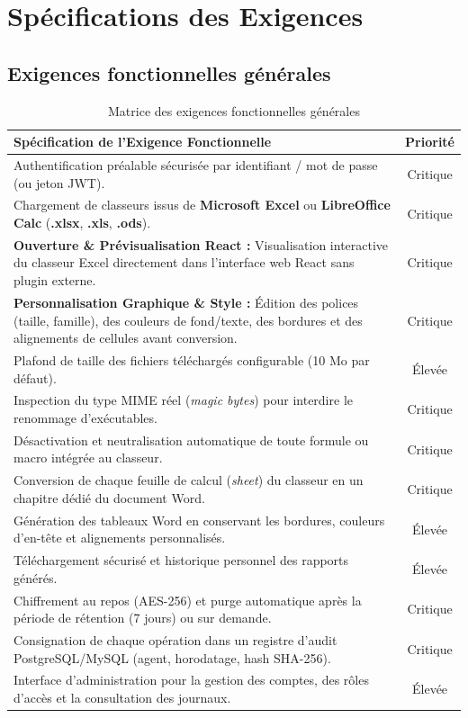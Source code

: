 \chapter{Spécifications des Exigences}

\section{Exigences fonctionnelles générales}

\renewcommand{\arraystretch}{1.3}
\begin{table}[H]
\centering
\small
\begin{tabular}{|L{11.5cm}|c|}
\hline
{}
\textbf{Spécification de l'Exigence Fonctionnelle} & \textbf{Priorité} \\
\hline
Authentification préalable sécurisée par identifiant / mot de passe (ou jeton JWT). & Critique \\
\hline
Chargement de classeurs issus de \textbf{Microsoft Excel} ou \textbf{LibreOffice Calc} (\textbf{.xlsx}, \textbf{.xls}, \textbf{.ods}). & Critique \\
\hline
\textbf{Ouverture \& Prévisualisation React :} Visualisation interactive du classeur Excel directement dans l'interface web React sans plugin externe. & Critique \\
\hline
\textbf{Personnalisation Graphique \& Style :} Édition des polices (taille, famille), des couleurs de fond/texte, des bordures et des alignements de cellules avant conversion. & Critique \\
\hline
Plafond de taille des fichiers téléchargés configurable (10 Mo par défaut). & Élevée \\
\hline
Inspection du type MIME réel (\textit{magic bytes}) pour interdire le renommage d'exécutables. & Critique \\
\hline
Désactivation et neutralisation automatique de toute formule ou macro intégrée au classeur. & Critique \\
\hline
Conversion de chaque feuille de calcul (\textit{sheet}) du classeur en un chapitre dédié du document Word. & Critique \\
\hline
Génération des tableaux Word en conservant les bordures, couleurs d'en-tête et alignements personnalisés. & Élevée \\
\hline
Téléchargement sécurisé et historique personnel des rapports générés. & Élevée \\
\hline
Chiffrement au repos (AES-256) et purge automatique après la période de rétention (7 jours) ou sur demande. & Critique \\
\hline
Consignation de chaque opération dans un registre d'audit PostgreSQL/MySQL (agent, horodatage, hash SHA-256). & Critique \\
\hline
Interface d'administration pour la gestion des comptes, des rôles d'accès et la consultation des journaux. & Élevée \\
\hline
\end{tabular}
\caption{Matrice des exigences fonctionnelles générales}
\end{table}

